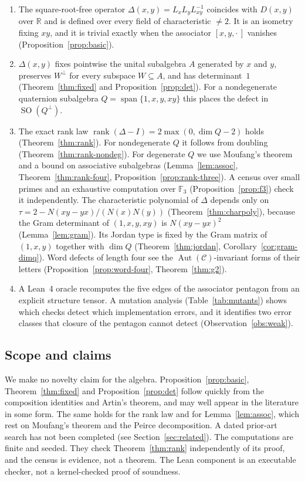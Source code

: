 \documentclass[11pt]{amsart}
\theoremstyle{definition}
\theoremstyle{remark}
\newcommand{\F}{\mathbb{F}}
\newcommand{\R}{\mathbb{R}}
\newcommand{\C}{\mathcal{C}}
\DeclareMathOperator{\rank}{rank}
\DeclareMathOperator{\SO}{SO}
\DeclareMathOperator{\spn}{span}
\begin{document}
\begin{enumerate}[label=(\roman*)]
\item The square-root-free operator $\Delta(x,y)=L_xL_yL_{xy}^{-1}$ coincides
  with $D(x,y)$ over $\R$ and is defined over every field of characteristic
  $\neq2$. It is an isometry fixing $xy$, and it is trivial exactly when the
  associator $[x,y,\cdot\,]$ vanishes (Proposition~\ref{prop:basic}).
\item $\Delta(x,y)$ fixes pointwise the unital subalgebra $A$ generated by $x$
  and $y$, preserves $W^\perp$ for every subspace $W\subseteq A$, and has
  determinant~$1$ (Theorem~\ref{thm:fixed} and
  Proposition~\ref{prop:det}). For a nondegenerate quaternion subalgebra
  $Q=\spn\{1,x,y,xy\}$ this places the defect in $\SO(Q^\perp)$.
\item The exact rank law $\rank(\Delta-I)=2\max(0,\dim Q-2)$ holds
  (Theorem~\ref{thm:rank}). For nondegenerate $Q$ it follows from doubling
  (Theorem~\ref{thm:rank-nondeg}). For degenerate $Q$ we use Moufang's
  theorem and a bound on associative subalgebras (Lemma~\ref{lem:assoc},
  Theorem~\ref{thm:rank-four}, Proposition~\ref{prop:rank-three}). A census
  over small primes and an exhaustive computation over $\F_3$
  (Proposition~\ref{prop:f3}) check it independently. The characteristic
  polynomial of $\Delta$ depends only on $\tau=2-N(xy-yx)/(N(x)N(y))$
  (Theorem~\ref{thm:charpoly}), because the Gram determinant of
  $(1,x,y,xy)$ is $N(xy-yx)^2$ (Lemma~\ref{lem:gram}). Its Jordan type is
  fixed by the Gram matrix of $(1,x,y)$ together with $\dim Q$
  (Theorem~\ref{thm:jordan}, Corollary~\ref{cor:gram-dimq}). Word defects
  of length four see the $\operatorname{Aut}(\C)$-invariant forms of their
  letters (Proposition~\ref{prop:word-four},
  Theorem~\ref{thm:g2}).
\item A Lean~4 oracle recomputes the five edges of the associator pentagon
  from an explicit structure tensor. A mutation analysis
  (Table~\ref{tab:mutants}) shows which checks detect which implementation
  errors, and it identifies two error classes that closure of the pentagon
  cannot detect (Observation~\ref{obs:weak}).
\end{enumerate}

\subsection*{Scope and claims}
We make no novelty claim for the algebra. Proposition~\ref{prop:basic},
Theorem~\ref{thm:fixed} and Proposition~\ref{prop:det} follow quickly from
the composition identities and Artin's theorem, and may well appear in the
literature in some form. The same holds for the rank law and for
Lemma~\ref{lem:assoc}, which rest on Moufang's theorem and the Peirce
decomposition. A dated prior-art search has not been completed (see
Section~\ref{sec:related}). The computations are finite and seeded. They
check Theorem~\ref{thm:rank} independently of its proof, and the census is
evidence, not a theorem. The Lean component is an executable checker, not a
kernel-checked proof of soundness.
\end{document}

